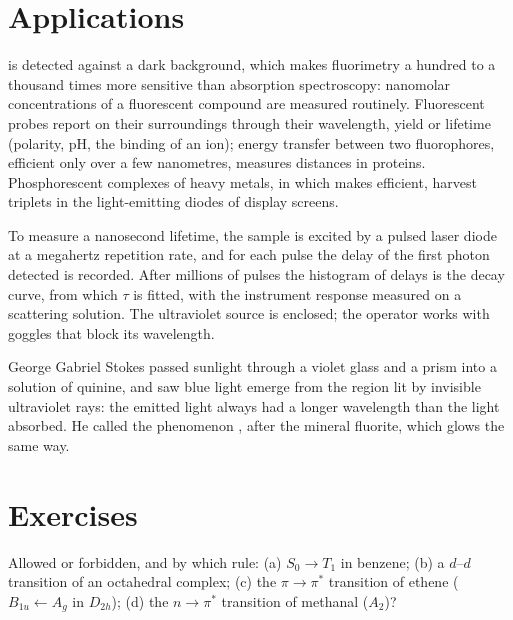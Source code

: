 \section{Applications}

 is detected against a dark background, which makes fluorimetry
a hundred to a thousand times more sensitive than absorption spectroscopy:
nanomolar concentrations of a fluorescent compound are measured routinely.
Fluorescent probes report on their surroundings through their wavelength,
yield or lifetime (polarity, pH, the binding of an ion); energy transfer
between two fluorophores, efficient only over a few nanometres, measures
distances in proteins. Phosphorescent complexes of heavy metals, in which
 makes  efficient, harvest triplets
in the light-emitting diodes of display screens.

\begin{inthelab}
To measure a nanosecond lifetime, the sample is excited by a pulsed laser
diode at a megahertz repetition rate, and for each pulse the delay of the
first  photon detected is recorded. After millions of pulses the
histogram of delays is the decay curve, from which $\tau$ is fitted, with the
instrument response measured on a scattering solution. The ultraviolet
source is enclosed; the operator works with goggles that block its
wavelength.
\end{inthelab}

\begin{history}[Stokes, 1852]
George Gabriel Stokes passed sunlight through a violet glass and a prism
into a solution of quinine, and saw blue light emerge from the region lit by
invisible ultraviolet rays: the emitted light always had a longer wavelength
than the light absorbed. He called the phenomenon , after the
mineral fluorite, which glows the same way.
\end{history}

\section{Exercises}

\begin{exercise}[$\star$]\label{exo:b3:electronic-spectroscopy:1}
Allowed or forbidden, and by which rule: (a) $S_0 \to T_1$ in benzene; (b) a $d$--$d$
transition of an octahedral complex; (c) the $\pi\to\pi^*$ transition of ethene
($B_{1u} \leftarrow A_g$ in $D_{2h}$); (d) the $n\to\pi^*$ transition of methanal
($A_2$)?
\end{exercise}

